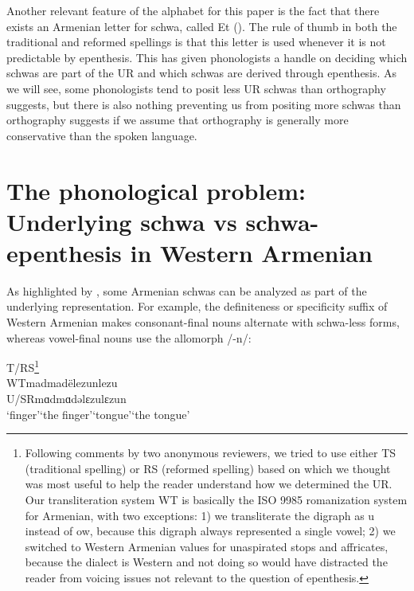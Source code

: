 \documentclass[output=paper,colorlinks,citecolor=brown]{langscibook}
\begin{document}
Another relevant feature of the alphabet for this paper is the fact that there exists an Armenian letter for schwa, called Et ().  The rule of thumb in both the traditional and reformed spellings is that this letter is used whenever it is not predictable by epenthesis. This has given phonologists a handle on deciding which schwas are part of the UR and which schwas are derived through epenthesis.  As we will see, some phonologists tend to posit less UR schwas than orthography suggests, but there is also nothing preventing us from positing more schwas than orthography suggests if we assume that orthography is generally more conservative than the spoken language.

\section{The phonological problem: Underlying schwa vs schwa-epenthesis in Western Armenian}
As highlighted by \citet{Baronian2017}, some Armenian schwas can be analyzed as part of the underlying representation. For example, the definiteness or specificity suffix of Western Armenian \citep{Sigler1996} makes consonant-final nouns alternate with schwa-less forms, whereas vowel-final nouns use the allomorph /-n/: 

\begin{exe}
    \ex T/RS\footnote{Following comments by two anonymous reviewers, we tried to use either TS (traditional spelling) or RS (reformed spelling) based on which we thought was most useful to help the reader understand how we determined the UR.  Our transliteration system WT is basically the ISO 9985 romanization system for Armenian, with two exceptions: 1) we transliterate the digraph  as u instead of ow, because this digraph always represented a single vowel; 2) we switched to Western Armenian values for unaspirated stops and affricates, because the dialect is Western and not doing so would have distracted the reader from voicing issues not relevant to the question of epenthesis.} \tab		{}	\tab	{}\tab		{}	\tab	\armenian{լեզուն}\\
WT\tab		mad\tab		madë\tab		lezun\tab		lezu\\
U/SR\tab		mɑd\tab		mɑdə\tab		lɛzu\tab		lɛzun\\
 \tab \tab ‘finger’\tab	‘the finger’\tab	‘tongue’\tab	‘the tongue’

\end{exe}
\end{document}

